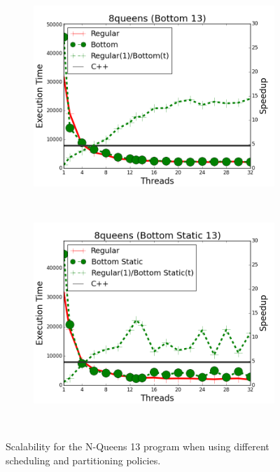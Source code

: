\begin{figure}[]
        \begin{subfigure}[b]{\plotsize\textwidth}
           \includegraphics[width=\textwidth]{experiments/coordination/cmp-bottom-8queens-13.png}
           \caption{}
           \label{fig:coordination:coord_13queensbottom}
        \end{subfigure} ~
        \begin{subfigure}[b]{\plotsize\textwidth}
           \includegraphics[width=\textwidth]{experiments/coordination/cmp-bottom-static-8queens-13.png}
           \caption{}
           \label{fig:coordination:coord_13queensbottomstatic}
        \end{subfigure} \\
        \caption{Scalability for the N-Queens 13 program when using different
        scheduling and partitioning policies.}
        \label{fig:coordination:results_queens-13}
\end{figure}

